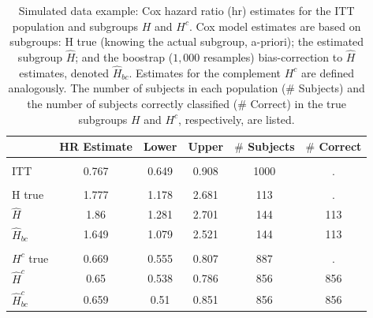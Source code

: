 \documentclass[smallextended]{svjour3}
\begin{document}
\begin{table}

\caption{\label{tab:simex_tab}\label{tab:simex} Simulated data example: Cox hazard ratio (hr) estimates for the ITT population and subgroups $H$ and $H^{c}$.
Cox model estimates are based on subgroups: H true (knowing the actual subgroup, a-priori); the estimated subgroup $\hat{H}$; and 
the boostrap ($1,000$ resamples) bias-correction to $\hat{H}$ estimates, denoted $\hat{H}_{bc}$.  Estimates for the complement $H^{c}$ are defined analogously.
The number of subjects in each population ($\#$ Subjects) and the number of subjects correctly classified ($\#$ Correct) in the true subgroups $H$ and $H^{c}$, respectively, are listed.}
\centering
\fontsize{9}{11}\selectfont
\begin{tabular}[t]{lccccc}
\toprule
  & HR Estimate & Lower & Upper & $\#$ Subjects & $\#$ Correct\\
\midrule
\addlinespace[0.3em]
\multicolumn{6}{l}{\textbf{ITT}}\\
\hspace{1em}ITT & 0.767 & 0.649 & 0.908 & 1000 & .\\
\addlinespace[0.3em]
\multicolumn{6}{l}{\textbf{H subgroup estimates}}\\
\hspace{1em}H true & 1.777 & 1.178 & 2.681 & 113 & .\\
\hspace{1em}$\hat{H}$ & 1.86 & 1.281 & 2.701 & 144 & 113\\
\hspace{1em}$\hat{H}_{bc}$ & 1.649 & 1.079 & 2.521 & 144 & 113\\
\addlinespace[0.3em]
\multicolumn{6}{l}{\textbf{H-complement subgroup estimates}}\\
\hspace{1em}$H^{c}$ true & 0.669 & 0.555 & 0.807 & 887 & .\\
\hspace{1em}$\hat{H}^{c}$ & 0.65 & 0.538 & 0.786 & 856 & 856\\
\hspace{1em}$\hat{H}^{c}_{bc}$ & 0.659 & 0.51 & 0.851 & 856 & 856\\
\bottomrule
\end{tabular}
\end{table}





\end{document}

